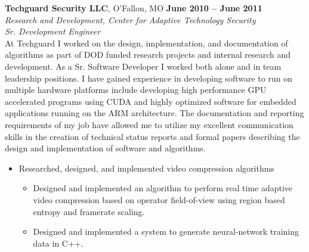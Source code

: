 \documentclass[margin,line]{resume}
\begin{document}
\begin{resume}
\textbf{Techguard Security LLC}, O'Fallon, MO \hfill \textbf{June 2010 -- June 2011}\vspace{1mm}\\\vspace{1mm}%
\textit{\small{Research and Development, Center for Adaptive Technology Security}}\vspace{1mm}\\\vspace{0mm}%
\textsl{Sr. Development Engineer}\\
At Techguard I worked on the design, implementation, and documentation of
algorithms as part of DOD funded research projects and internal research and
development. As a Sr. Software Developer I worked both alone and in team
leadership positions. I have gained experience in developing software to run on
multiple hardware platforms include developing high performance GPU accelerated
programs using CUDA and highly optimized software for embedded applications
running on the ARM architecture.  The documentation and reporting requirements
of my job have allowed me to utilize my excellent communication skills in the
creation of technical status reports and formal papers describing the design
and implementation of software and algorithms. 
\vspace{1mm}\\\vspace{0mm}
\begin{itemize}
    \item Researched, designed, and implemented video compression algorithms
        \begin{itemize}
        \item Designed and implemented an algorithm to perform real time
              adaptive video compression based on operator field-of-view using
              region based entropy and framerate scaling.
        \item Designed and implemented a system to generate neural-network
              training data in C++.

\end{itemize}
\end{itemize}
\end{resume}
\end{document}
